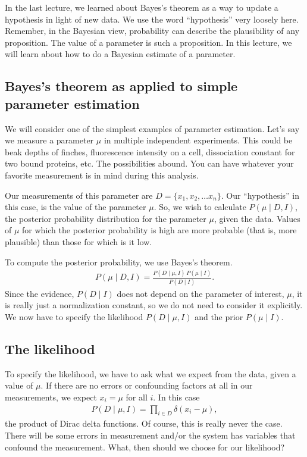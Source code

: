 In the last lecture, we learned about Bayes's theorem as a way to
update a hypothesis in light of new data.  We use the word
``hypothesis'' very loosely here.  Remember, in the Bayesian view,
probability can describe the plausibility of any proposition.  The
value of a parameter is such a proposition.  In this lecture, we will
learn about how to do a Bayesian estimate of a parameter.


\subsection{Bayes's theorem as applied to simple parameter estimation}
We will consider one of the simplest examples of parameter estimation.
Let's say we measure a parameter $\mu$ in multiple independent
experiments.  This could be beak depths of finches, fluorescence
intensity on a cell, dissociation constant for two bound proteins,
etc.  The possibilities abound.  You can have whatever your favorite
measurement is in mind during this analysis.

Our measurements of this parameter are $D = \{x_1, x_2, \ldots x_n\}$.
Our ``hypothesis'' in this case, is the value of the parameter $\mu$.
So, we wish to calculate $P(\mu \mid D, I)$, the posterior probability
distribution for the parameter $\mu$, given the data.  Values of $\mu$
for which the posterior probability is high are more probable (that
is, more plausible) than those for which is it low.

To compute the posterior probability, we use Bayes's theorem.
\begin{align}
P(\mu\mid D, I) = \frac{P(D\mid \mu, I)\,P(\mu \mid I)}{P(D\mid I)}.
\end{align}
Since the evidence, $P(D\mid I)$ does not depend on the parameter of
interest, $\mu$, it is really just a normalization constant, so we do
not need to consider it explicitly.  We now have to specify the
likelihood $P(D\mid \mu, I)$ and the prior $P(\mu \mid I)$.


\subsection{The likelihood}
To specify the likelihood, we have to ask what we expect from the
data, given a value of $\mu$.  If there are no errors or confounding
factors at all in our measurements, we expect $x_i = \mu$ for all $i$.
In this case
\begin{align}
P(D\mid \mu, I) = \prod_{i\in D}\delta(x_i - \mu),
\end{align}
the product of Dirac delta functions.  Of course, this is really never
the case.  There will be some errors in measurement and/or the system
has variables that confound the measurement.  What, then should we
choose for our likelihood?

